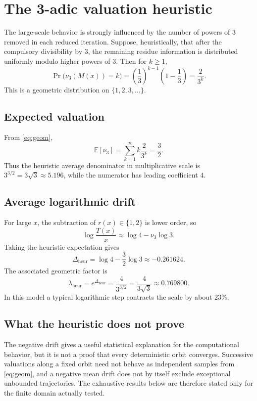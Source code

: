 \documentclass[11pt]{article}
\newcommand{\vthree}{\nu_3}
\newcommand{\Tmap}{T}
\newcommand{\Mmap}{M}
\begin{document}
\section{The 3-adic valuation heuristic}
The large-scale behavior is strongly influenced by the number of powers of $3$ removed in each reduced iteration.  Suppose, heuristically, that after the compulsory divisibility by $3$, the remaining residue information is distributed uniformly modulo higher powers of $3$.  Then for $k\ge1$,
\begin{equation}
\Pr\bigl(\vthree(\Mmap(x))=k\bigr)
=\left(\frac13\right)^{k-1}\left(1-\frac13\right)
=\frac{2}{3^k}.
\label{eq:geom}
\end{equation}
This is a geometric distribution on $\{1,2,3,\ldots\}$.

\subsection{Expected valuation}
From \eqref{eq:geom},
\begin{equation}
\mathbb E[\vthree]
=\sum_{k=1}^{\infty} k\frac{2}{3^k}
=\frac32.
\label{eq:meanv}
\end{equation}
Thus the heuristic average denominator in multiplicative scale is $3^{3/2}=3\sqrt3\approx5.196$, while the numerator has leading coefficient $4$.

\subsection{Average logarithmic drift}
For large $x$, the subtraction of $r(x)\in\{1,2\}$ is lower order, so
\[
\log\frac{\Tmap(x)}{x}
\approx \log4-\vthree\log3.
\]
Taking the heuristic expectation gives
\begin{equation}
\Delta_{\mathrm{heur}}
=\log4-\frac32\log3
\approx-0.261624.
\label{eq:drift}
\end{equation}
The associated geometric factor is
\begin{equation}
\lambda_{\mathrm{heur}}
=e^{\Delta_{\mathrm{heur}}}
=\frac{4}{3^{3/2}}
=\frac{4}{3\sqrt3}
\approx0.769800.
\label{eq:lambda}
\end{equation}
In this model a typical logarithmic step contracts the scale by about $23\%$.

\subsection{What the heuristic does not prove}
The negative drift gives a useful statistical explanation for the computational behavior, but it is not a proof that every deterministic orbit converges.  Successive valuations along a fixed orbit need not behave as independent samples from \eqref{eq:geom}, and a negative mean drift does not by itself exclude exceptional unbounded trajectories.  The exhaustive results below are therefore stated only for the finite domain actually tested.
\end{document}

